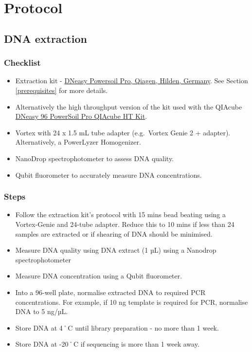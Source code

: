 \documentclass[
]{book}
\providecommand{\tightlist}{%
  \setlength{\itemsep}{0pt}\setlength{\parskip}{0pt}}
\begin{document}
\chapter{Protocol}\label{protocol}

\section{DNA extraction}\label{dna-extraction}

\subsection{Checklist}\label{checklist}

\begin{itemize}
\tightlist
\item
  Extraction kit - \href{https://www.qiagen.com/au/resources/resourcedetail?id=9bb59b74-e493-4aeb-b6c1-f660852e8d97&lang=en}{DNeasy Powersoil Pro, Qiagen, Hilden, Germany}. See Section \ref{prerequisites} for more details.
\item
  Alternatively the high throughput version of the kit used with the QIAcube \href{https://rmiteduau-my.sharepoint.com/personal/christian_krohn_rmit_edu_au/Documents/Experiments/2025_ETPSequencingProject/_\%09https:/www.qiagen.com/au/products/discovery-and-translational-research/dna-rna-purification/dna-purification/microbial-dna/dneasy-96-powersoil-pro-qiacube-ht-kit}{DNeasy 96 PowerSoil Pro QIAcube HT Kit}.
\item
  Vortex with 24 x 1.5 mL tube adapter (e.g.~Vortex Genie 2 + adapter). Alternatively, a PowerLyzer Homogenizer.
\item
  NanoDrop spectrophotometer to assess DNA quality.
\item
  Qubit fluorometer to accurately measure DNA concentrations.
\end{itemize}

\subsection{Steps}\label{steps}

\begin{itemize}
\tightlist
\item
  Follow the extraction kit's protocol with 15 mins bead beating using a Vortex-Genie and 24-tube adapter. Reduce this to 10 mins if less than 24 samples are extracted or if shearing of DNA should be minimised.
\item
  Measure DNA quality using DNA extract (1 µL) using a Nanodrop spectrophotometer
\item
  Measure DNA concentration using a Qubit fluorometer.
\item
  Into a 96-well plate, normalise extracted DNA to required PCR concentrations. For example, if 10 ng template is required for PCR, normalise DNA to 5 ng/µL.
\item
  Store DNA at 4˚C until library preparation - no more than 1 week.
\item
  Store DNA at -20˚C if sequencing is more than 1 week away.
\end{itemize}
\end{document}
